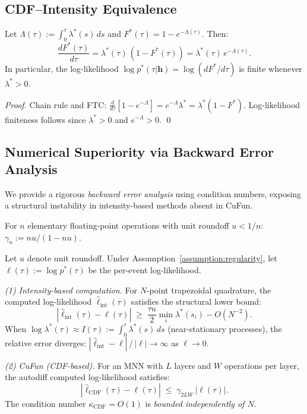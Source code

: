 \subsection{CDF--Intensity Equivalence}

\begin{theorem}
\label{thm:cdf-intensity}
Let $\Lambda(\tau) := \int_0^\tau \lambda^*(s)\,ds$ and
$F^*(\tau) = 1 - e^{-\Lambda(\tau)}$.  Then:
\[
  \frac{dF^*(\tau)}{d\tau}
  = \lambda^*(\tau)\,(1 - F^*(\tau))
  = \lambda^*(\tau)\,e^{-\Lambda(\tau)}.
\]
In particular, the log-likelihood $\log p^*(\tau|\boldsymbol{h})
= \log(dF^*/d\tau)$ is finite whenever $\lambda^* > 0$.
\end{theorem}

\begin{proof}
Chain rule and FTC:
$\frac{d}{d\tau}[1 - e^{-\Lambda}] = e^{-\Lambda}\lambda^* = \lambda^*(1-F^*)$.
Log-likelihood finiteness follows since $\lambda^*>0$ and $e^{-\Lambda}>0$. \qed
\end{proof}

\subsection{Numerical Superiority via Backward Error Analysis}

We provide a rigorous \emph{backward error analysis} using condition numbers,
exposing a structural instability in intensity-based methods absent in CuFun.

\begin{definition}
For $n$ elementary floating-point operations with unit roundoff $u < 1/n$:
$\gamma_n := nu/(1-nu)$.
\end{definition}

\begin{theorem}
\label{thm:numerical_superiority}
Let $u$ denote unit roundoff. Under Assumption~\ref{assumption:regularity},
let $\ell(\tau) := \log p^*(\tau)$ be the per-event log-likelihood.

\emph{(1) Intensity-based computation.}
For $N$-point trapezoidal quadrature, the computed log-likelihood
$\hat{\ell}_{\mathrm{int}}(\tau)$ satisfies the structural lower bound:
\[
|\hat{\ell}_{\mathrm{int}}(\tau) - \ell(\tau)|
\;\geq\; \frac{\tau u}{2} \min_i \lambda^*(s_i)  - O(N^{-2}).
\]
When $\log\lambda^*(\tau) \approx I(\tau) := \int_0^\tau\lambda^*(s)\,ds$
(near-stationary processes), the relative error diverges:
$|\hat{\ell}_{\mathrm{int}} - \ell|\,/\,|\ell| \to \infty$ as $\ell \to 0$.

\emph{(2) CuFun (CDF-based).}
For an MNN with $L$ layers and $W$ operations per layer,
the autodiff computed log-likelihood satisfies:
\[
|\hat{\ell}_{\mathrm{CDF}}(\tau) - \ell(\tau)| \;\leq\; \gamma_{2LW}\,|\ell(\tau)|.
\]
The condition number $\kappa_{\mathrm{CDF}} = O(1)$ is \emph{bounded independently of $N$}.
\end{theorem}

